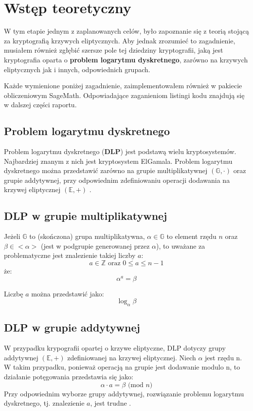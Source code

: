 \newpage %
\section{Wstęp teoretyczny}
\label{sc:wstep}
W tym etapie jednym z zaplanowanych celów, było zapoznanie się z teorią stojącą za
kryptografią krzywych eliptycznych. Aby jednak zrozumieć to zagadnienie, musiałem również
zgłębić szersze pole tej dziedziny kryptografii, jaką jest kryptografia oparta o \textbf{problem logarytmu dyskretnego}, zarówno na krzywych eliptycznych jak i innych, odpowiednich grupach.
\newline

\indent
Każde wymienione poniżej zagadnienie, zaimplementowałem również w pakiecie obliczeniowym SageMath. Odpowiadające zaganieniom listingi kodu znajdują się w dalszej części raportu.
\subsection{Problem logarytmu dyskretnego}
Problem logarytmu dyskretnego (\textbf{DLP}) jest podstawą wielu kryptosystemów. Najbardziej znanym z nich jest kryptosystem ElGamala. Problem logarytmu dyskretnego
można przedstawić zarówno na grupie multiplikatywnej $(\mathbb{G},\cdot)$
oraz grupie addytywnej, przy odpowiednim zdefiniowaniu
operacji dodawania na krzywej eliptycznej $(\mathbb{E},+)$ \cite{stinson21}.

\subsection{DLP w grupie multiplikatywnej}
Jeżeli $\mathbb{G}$ to (skończona) grupa multiplikatywna, $\alpha \in \mathbb{G}$
to element rzędu $n$ oraz $\beta \in \mathbb{<\alpha>}$ (jest w podgrupie generowanej
przez $\alpha$), to uważane za problematyczne jest znalezienie takiej liczby $a$:
\[a \in \mathbb{Z} \textrm{ oraz } 0\le a \le n-1\]
że:
\[\alpha ^ a = \beta\]

Liczbę $a$ można przedstawić jako:
\[\log_{\alpha}{\beta}\]


\subsection{DLP w grupie addytywnej}
W przypadku krypografii opartej o krzywe eliptyczne, DLP dotyczy
grupy addytywnej $(\mathbb{E},+)$ zdefiniowanej na krzywej eliptycznej.
Niech $\alpha$ jest rzędu n.
W takim przypadku, ponieważ operacją na grupie jest dodawanie modulo n, to działanie
potęgowania przedstawia się jako:
\[\alpha \cdot a = \beta \textrm{ (mod } n)\]
Przy odpowiednim wyborze grupy addytywnej, rozwiązanie problemu logarytmu dyskretnego,
tj. znalezienie $a$,
jest trudne \cite{chrzaszczyk2010}\cite{stinson21}.
